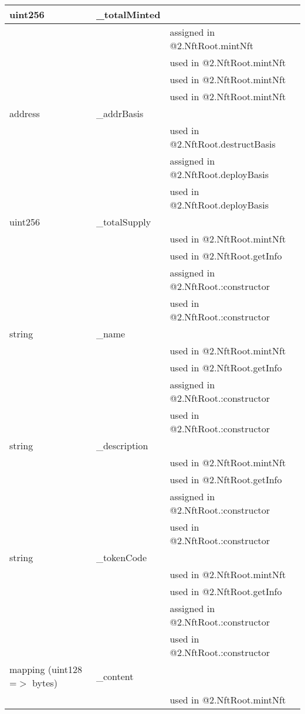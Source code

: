 \ifsoltables
\noindent\begin{tabular}{|l|l|p{5cm}|}\hline
uint256 & \_{}totalMinted &  \\\hline
 & & assigned in @2.NftRoot.mintNft\\\hline
 & & used in @2.NftRoot.mintNft\\\hline
 & & used in @2.NftRoot.mintNft\\\hline
 & & used in @2.NftRoot.mintNft\\\hline
address & \_{}addrBasis &  \\\hline
 & & used in @2.NftRoot.destructBasis\\\hline
 & & assigned in @2.NftRoot.deployBasis\\\hline
 & & used in @2.NftRoot.deployBasis\\\hline
uint256 & \_{}totalSupply &  \\\hline
 & & used in @2.NftRoot.mintNft\\\hline
 & & used in @2.NftRoot.getInfo\\\hline
 & & assigned in @2.NftRoot.:constructor\\\hline
 & & used in @2.NftRoot.:constructor\\\hline
string & \_{}name &  \\\hline
 & & used in @2.NftRoot.mintNft\\\hline
 & & used in @2.NftRoot.getInfo\\\hline
 & & assigned in @2.NftRoot.:constructor\\\hline
 & & used in @2.NftRoot.:constructor\\\hline
string & \_{}description &  \\\hline
 & & used in @2.NftRoot.mintNft\\\hline
 & & used in @2.NftRoot.getInfo\\\hline
 & & assigned in @2.NftRoot.:constructor\\\hline
 & & used in @2.NftRoot.:constructor\\\hline
string & \_{}tokenCode &  \\\hline
 & & used in @2.NftRoot.mintNft\\\hline
 & & used in @2.NftRoot.getInfo\\\hline
 & & assigned in @2.NftRoot.:constructor\\\hline
 & & used in @2.NftRoot.:constructor\\\hline
mapping (uint128 =$>$ bytes) & \_{}content &  \\\hline
 & & used in @2.NftRoot.mintNft\\\hline

\end{tabular}
